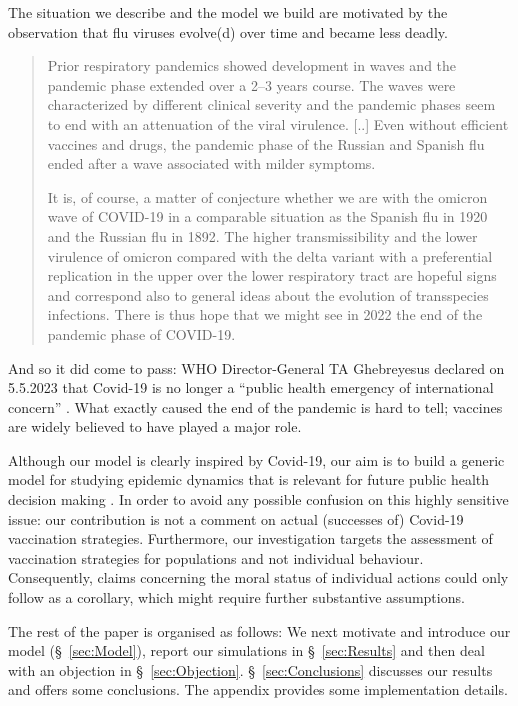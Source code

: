 \documentclass[a4paper,12pt]{article}
\begin{document}
The situation we describe and the model we build are motivated by the observation that flu viruses evolve(d) over time and became less deadly.
\begin{quote}
Prior respiratory pandemics showed development in waves and the pandemic phase extended over a 2–3 years course. The waves were characterized by different clinical severity and the pandemic phases seem to end with an attenuation of the viral virulence. [..] Even without efficient vaccines and drugs, the pandemic phase of the Russian and Spanish flu ended after a wave associated with milder symptoms.

It is, of course, a matter of conjecture whether we are with the omicron wave of COVID-19 in a comparable situation as the Spanish flu in 1920 and the Russian flu in 1892. The higher transmissibility and the lower virulence of omicron compared with the delta variant with a preferential replication in the upper over the lower respiratory tract are hopeful signs and correspond also to general ideas about the evolution of transspecies infections. There is thus hope that we might see in 2022 the end of the pandemic phase of COVID-19. \cite[P.\ 1314]{Bruessow2022} 
\end{quote}
And so it did come to pass: WHO Director-General TA Ghebreyesus declared on 5.5.2023 that Covid-19 is no longer a ``public health emergency of international concern'' \cite{WHO2023}. What exactly caused the end of the pandemic is hard to tell; vaccines are widely believed to have played a major role.

Although our model is clearly inspired by Covid-19, our aim is to build a generic model for studying epidemic dynamics that is relevant for future public health decision making \cite{Casadevall2024}. In order to avoid any possible confusion on this highly sensitive issue: our contribution is not a comment on actual (successes of) Covid-19 vaccination strategies. Furthermore, our investigation targets the assessment of vaccination strategies for populations and not individual behaviour. Consequently, claims concerning the moral status of individual actions could only follow as a corollary, which might require further substantive assumptions.

The rest of the paper is organised as follows: We next motivate and introduce our model (\S~\ref{sec:Model}), report our simulations in \S~\ref{sec:Results} and then deal with an objection in \S~\ref{sec:Objection}. \S~\ref{sec:Conclusions} discusses our results and offers some conclusions. The appendix provides some implementation details.
\end{document}
